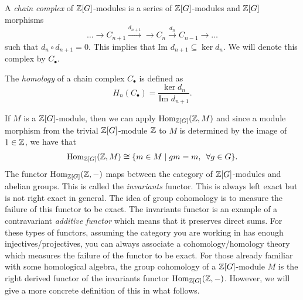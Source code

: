 \begin{definition}
    A \emph{chain complex} of $\mathbb{Z} [G]$-modules is a series of $\mathbb{Z}[G]$-modules and $\mathbb{Z}[G]$ morphisms
    $$
        \dots \to C_{n+1} \xrightarrow{d_{n+1}} \to C_n \xrightarrow{d_n} C_{n-1} \to \dots
    $$
    such that $d_n \circ d_{n+1} = 0$. This implies that $\text{Im }d_{n+1} \subseteq \ker d_{n}$. We will denote this complex by
    $C_{\bullet}$.
\end{definition}
\begin{definition}
    The \emph{homology} of a chain complex $C_{\bullet}$ is defined as
    $$
        H_n(C_{\bullet}) = \dfrac{\ker d_n}{\text{Im }d_{n+1}}.
    $$
\end{definition}

If $M$ is a $\mathbb{Z}[G]$-module, then we can apply $\operatorname{Hom}_{\mathbb{Z}[G]}(\mathbb{Z}, M)$ and since a
module morphism from the trivial $\mathbb{Z}[G]$-module $\mathbb{Z}$ to $M$ is determined by
the image of $1 \in \mathbb{Z}$, we have that
\begin{align*}
    \operatorname{Hom}_{\mathbb{Z}[G]}(\mathbb{Z}, M) \cong \{m \in M \mid gm = m, \enskip \forall g \in G\}.
\end{align*}
The functor $\operatorname{Hom}_{\mathbb{Z}[G]}(\mathbb{Z}, -)$ maps between the category of $\mathbb{Z}[G]$-modules and abelian groups. This is called the \emph{invariants} functor. This is always left exact but is not right exact
in general. The idea of group cohomology is to measure the failure of this functor to be exact. The invariants functor is an example of a contravariant \emph{additive functor} which means that it preserves
direct sums. For these types of functors, assuming the category you are working in has enough injectives/projectives, you can always associate a cohomology/homology theory which measures the failure of the functor to be exact. For those already familiar with some homological algebra,
the group cohomology of a $\mathbb{Z}[G]$-module $M$ is the right derived functor of the invariants functor $\operatorname{Hom}_{\mathbb{Z}[G]}(\mathbb{Z}, -)$. However, we will give a more concrete definition of this in what follows.

